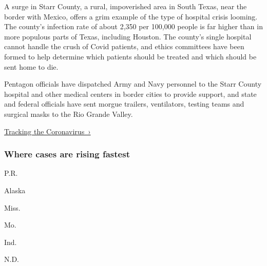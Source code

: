 A surge in Starr County, a rural, impoverished area in South Texas, near
the border with Mexico, offers a grim example of the type of hospital
crisis looming. The county's infection rate of about 2,350 per 100,000
people is far higher than in more populous parts of Texas, including
Houston. The county's single hospital cannot handle the crush of Covid
patients, and ethics committees have been formed to help determine which
patients should be treated and which should be sent home to die.

Pentagon officials have dispatched Army and Navy personnel to the Starr
County hospital and other medical centers in border cities to provide
support, and state and federal officials have sent morgue trailers,
ventilators, testing teams and surgical masks to the Rio Grande Valley.

\href{https://www.nytimes3xbfgragh.onion/interactive/2020/us/coronavirus-us-cases.html}{Tracking
the Coronavirus~›}

\href{https://www.nytimes3xbfgragh.onion/interactive/2020/us/coronavirus-us-cases.html}{}

\hypertarget{where-cases-are-rising-fastest}{%
\subsubsection{\texorpdfstring{Where cases are \textbf{rising}
fastest}{Where cases are rising fastest}}\label{where-cases-are-rising-fastest}}

\href{https://www.nytimes3xbfgragh.onion/interactive/2020/us/puerto-rico-coronavirus-cases.html}{}

P.R.

\href{https://www.nytimes3xbfgragh.onion/interactive/2020/us/alaska-coronavirus-cases.html}{}

Alaska

\href{https://www.nytimes3xbfgragh.onion/interactive/2020/us/mississippi-coronavirus-cases.html}{}

Miss.

\href{https://www.nytimes3xbfgragh.onion/interactive/2020/us/missouri-coronavirus-cases.html}{}

Mo.

\href{https://www.nytimes3xbfgragh.onion/interactive/2020/us/indiana-coronavirus-cases.html}{}

Ind.

\href{https://www.nytimes3xbfgragh.onion/interactive/2020/us/north-dakota-coronavirus-cases.html}{}

N.D.

